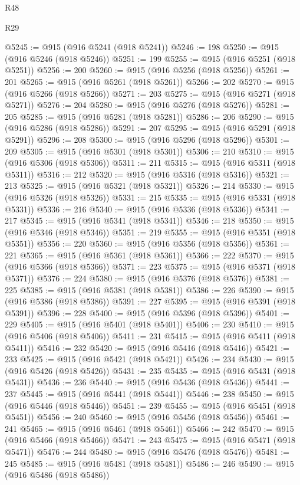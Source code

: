 \begin{lexlean}{R48}
\begin{lexlean}{R29}
\begin{coremodule}
{{{{{{{{{{{{{{{{{{{{{{{{{{{{{{{{{{{{{{{{{{{{{{{{{{{{{{{{{{{{{{{{{{{{{{{{{{{{{{{{{{{{{{{{{{{{{{{{{{{{{{{{{{{{{{{{{{{{{{{{{{{{{{{{{{{{{{{{{{{{{{{{{{{{{{{{{{{{{{{{{{{{{{{{{{{{{{{{{{{{{{{{{{{{{{{{{{{{{{{{{{{{{{{{{{{{{{{{{{@5245 := @915 (@916 @5241 (@918 @5241))
@5246 := 198
@5250 := @915 (@916 @5246 (@918 @5246))
@5251 := 199
@5255 := @915 (@916 @5251 (@918 @5251))
@5256 := 200
@5260 := @915 (@916 @5256 (@918 @5256))
@5261 := 201
@5265 := @915 (@916 @5261 (@918 @5261))
@5266 := 202
@5270 := @915 (@916 @5266 (@918 @5266))
@5271 := 203
@5275 := @915 (@916 @5271 (@918 @5271))
@5276 := 204
@5280 := @915 (@916 @5276 (@918 @5276))
@5281 := 205
@5285 := @915 (@916 @5281 (@918 @5281))
@5286 := 206
@5290 := @915 (@916 @5286 (@918 @5286))
@5291 := 207
@5295 := @915 (@916 @5291 (@918 @5291))
@5296 := 208
@5300 := @915 (@916 @5296 (@918 @5296))
@5301 := 209
@5305 := @915 (@916 @5301 (@918 @5301))
@5306 := 210
@5310 := @915 (@916 @5306 (@918 @5306))
@5311 := 211
@5315 := @915 (@916 @5311 (@918 @5311))
@5316 := 212
@5320 := @915 (@916 @5316 (@918 @5316))
@5321 := 213
@5325 := @915 (@916 @5321 (@918 @5321))
@5326 := 214
@5330 := @915 (@916 @5326 (@918 @5326))
@5331 := 215
@5335 := @915 (@916 @5331 (@918 @5331))
@5336 := 216
@5340 := @915 (@916 @5336 (@918 @5336))
@5341 := 217
@5345 := @915 (@916 @5341 (@918 @5341))
@5346 := 218
@5350 := @915 (@916 @5346 (@918 @5346))
@5351 := 219
@5355 := @915 (@916 @5351 (@918 @5351))
@5356 := 220
@5360 := @915 (@916 @5356 (@918 @5356))
@5361 := 221
@5365 := @915 (@916 @5361 (@918 @5361))
@5366 := 222
@5370 := @915 (@916 @5366 (@918 @5366))
@5371 := 223
@5375 := @915 (@916 @5371 (@918 @5371))
@5376 := 224
@5380 := @915 (@916 @5376 (@918 @5376))
@5381 := 225
@5385 := @915 (@916 @5381 (@918 @5381))
@5386 := 226
@5390 := @915 (@916 @5386 (@918 @5386))
@5391 := 227
@5395 := @915 (@916 @5391 (@918 @5391))
@5396 := 228
@5400 := @915 (@916 @5396 (@918 @5396))
@5401 := 229
@5405 := @915 (@916 @5401 (@918 @5401))
@5406 := 230
@5410 := @915 (@916 @5406 (@918 @5406))
@5411 := 231
@5415 := @915 (@916 @5411 (@918 @5411))
@5416 := 232
@5420 := @915 (@916 @5416 (@918 @5416))
@5421 := 233
@5425 := @915 (@916 @5421 (@918 @5421))
@5426 := 234
@5430 := @915 (@916 @5426 (@918 @5426))
@5431 := 235
@5435 := @915 (@916 @5431 (@918 @5431))
@5436 := 236
@5440 := @915 (@916 @5436 (@918 @5436))
@5441 := 237
@5445 := @915 (@916 @5441 (@918 @5441))
@5446 := 238
@5450 := @915 (@916 @5446 (@918 @5446))
@5451 := 239
@5455 := @915 (@916 @5451 (@918 @5451))
@5456 := 240
@5460 := @915 (@916 @5456 (@918 @5456))
@5461 := 241
@5465 := @915 (@916 @5461 (@918 @5461))
@5466 := 242
@5470 := @915 (@916 @5466 (@918 @5466))
@5471 := 243
@5475 := @915 (@916 @5471 (@918 @5471))
@5476 := 244
@5480 := @915 (@916 @5476 (@918 @5476))
@5481 := 245
@5485 := @915 (@916 @5481 (@918 @5481))
@5486 := 246
@5490 := @915 (@916 @5486 (@918 @5486))
}}}}}}}}}}}}}}}}}}}}}}}}}}}}}}}}}}}}}}}}}}}}}}}}}}}}}}}}}}}}}}}}}}}}}}}}}}}}}}}}}}}}}}}}}}}}}}}}}}}}}}}}}}}}}}}}}}}}}}}}}}}}}}}}}}}}}}}}}}}}}}}}}}}}}}}}}}}}}}}}}}}}}}}}}}}}}}}}}}}}}}}}}}}}}}}}}}}}}}}}}}}}}}}}}}}}}}}}}}
\end{coremodule}
\end{lexlean}
\end{lexlean}
